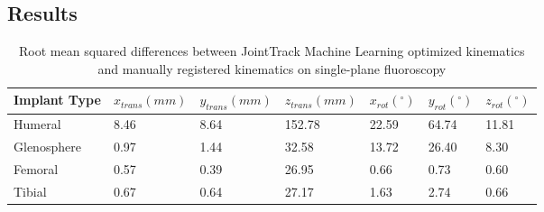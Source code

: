 \subsection{Results}
\begin{table}[h!]
	\caption{Root mean squared differences between JointTrack Machine Learning optimized kinematics and manually registered kinematics on single-plane fluoroscopy} \label{tab:jtml-tsa-tka-vals}
	\begin{tabularx}{\linewidth}{|X|X|X|X|X|X|X|}\hline
		{\bf Implant Type} & $x_{trans} (mm)$ & $y_{trans} (mm)$ & $z_{trans} (mm)$ & $x_{rot} (^{\circ})$ & $y_{rot} (^{\circ})$ & $z_{rot} (^{\circ})$ \\ \hline
		Humeral            & 8.46             & 8.64             & 152.78           & 22.59                & 64.74                & 11.81                \\\hline
		Glenosphere        & 0.97             & 1.44             & 32.58            & 13.72                & 26.40                & 8.30                 \\\hline
		Femoral            & 0.57             & 0.39             & 26.95            & 0.66                 & 0.73                 & 0.60                 \\\hline
		Tibial             & 0.67             & 0.64             & 27.17            & 1.63                 & 2.74                 & 0.66                 \\\hline
	\end{tabularx}
\end{table}


